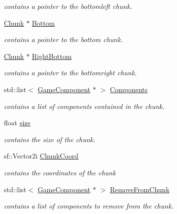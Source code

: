 \begin{DoxyCompactItemize}
\begin{DoxyCompactList}\small\item\em contains a pointer to the bottomleft chunk. \end{DoxyCompactList}\item 
\hyperlink{class_chunk}{Chunk} $\ast$ \hyperlink{class_chunk_ac9ac53a727ae045b6f751ec6a68bcaca}{Bottom}
\begin{DoxyCompactList}\small\item\em contains a pointer to the bottom chunk. \end{DoxyCompactList}\item 
\hyperlink{class_chunk}{Chunk} $\ast$ \hyperlink{class_chunk_afded01a9a67540c9f64dde5776021f4b}{Right\-Bottom}
\begin{DoxyCompactList}\small\item\em contains a pointer to the bottomright chunk. \end{DoxyCompactList}\item 
std\-::list$<$ \hyperlink{class_game_component}{Game\-Component} $\ast$ $>$ \hyperlink{class_chunk_a4cdf6febd96ff99b681e37d548617a38}{Components}
\begin{DoxyCompactList}\small\item\em contains a list of components contained in the chunk. \end{DoxyCompactList}\item 
float \hyperlink{class_chunk_af46410b580baf2985b01044d5c041b2e}{size}
\begin{DoxyCompactList}\small\item\em contains the size of the chunk. \end{DoxyCompactList}\item 
sf\-::\-Vector2i \hyperlink{class_chunk_abb5b1842148b3d7c616065766bfd2b33}{Chunk\-Coord}
\begin{DoxyCompactList}\small\item\em contains the coordinates of the chunk \end{DoxyCompactList}\item 
std\-::list$<$ \hyperlink{class_game_component}{Game\-Component} $\ast$ $>$ \hyperlink{class_chunk_adf6692fdab4518524e217cc0ef09d282}{Remove\-From\-Chunk}
\begin{DoxyCompactList}\small\item\em contains a list of components to remove from the chunk. \end{DoxyCompactList}\end{DoxyCompactItemize}


